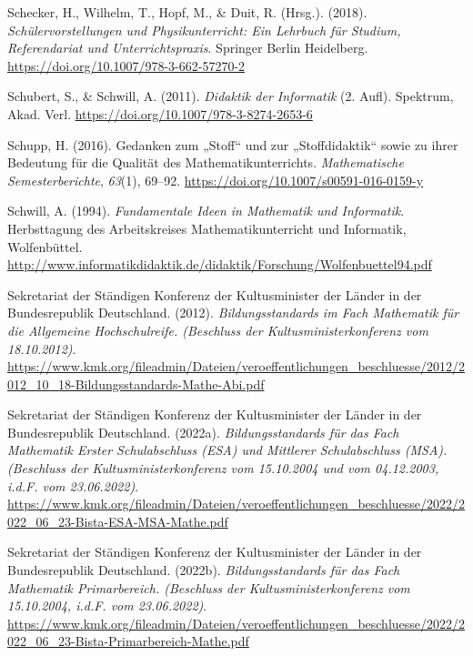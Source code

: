 \documentclass[
]{scrbook}
\newlength{\cslhangindent}
\newenvironment{CSLReferences}[2] %
 {\begin{list}{}{%
  \setlength{\itemindent}{0pt}
  \setlength{\leftmargin}{0pt}
  \setlength{\parsep}{0pt}
  \ifodd #1
   \setlength{\leftmargin}{\cslhangindent}
   \setlength{\itemindent}{-1\cslhangindent}
  \fi
  \setlength{\itemsep}{#2\baselineskip}}}
 {\end{list}}
\theoremstyle{definition}
\theoremstyle{definition}
\theoremstyle{definition}
\theoremstyle{definition}
\theoremstyle{remark}
\begin{document}
\begin{CSLReferences}{1}{0}
Schecker, H., Wilhelm, T., Hopf, M., \& Duit, R. (Hrsg.). (2018). \emph{Schülervorstellungen und {Physikunterricht}: {Ein} {Lehrbuch} für {Studium}, {Referendariat} und {Unterrichtspraxis}}. Springer Berlin Heidelberg. \url{https://doi.org/10.1007/978-3-662-57270-2}

Schubert, S., \& Schwill, A. (2011). \emph{Didaktik der {Informatik}} (2. Aufl). Spektrum, Akad. Verl. \url{https://doi.org/10.1007/978-3-8274-2653-6}

Schupp, H. (2016). Gedanken zum „{Stoff}`` und zur „{Stoffdidaktik}`` sowie zu ihrer {Bedeutung} für die {Qualität} des {Mathematikunterrichts}. \emph{Mathematische Semesterberichte}, \emph{63}(1), 69--92. \url{https://doi.org/10.1007/s00591-016-0159-y}

Schwill, A. (1994). \emph{Fundamentale {Ideen} in {Mathematik} und {Informatik}}. Herbsttagung des Arbeitskreises Mathematikunterricht und Informatik, Wolfenbüttel. \url{http://www.informatikdidaktik.de/didaktik/Forschung/Wolfenbuettel94.pdf}

Sekretariat der Ständigen Konferenz der Kultusminister der Länder in der Bundesrepublik Deutschland. (2012). \emph{Bildungsstandards im {Fach} {Mathematik} für die {Allgemeine} {Hochschulreife}. (Beschluss der Kultusministerkonferenz vom 18.10.2012)}. \url{https://www.kmk.org/fileadmin/Dateien/veroeffentlichungen_beschluesse/2012/2012_10_18-Bildungsstandards-Mathe-Abi.pdf}

Sekretariat der Ständigen Konferenz der Kultusminister der Länder in der Bundesrepublik Deutschland. (2022a). \emph{Bildungsstandards für das {Fach} {Mathematik} {Erster} {Schulabschluss} ({ESA}) und {Mittlerer} {Schulabschluss} ({MSA}). ({Beschluss} der {Kultusministerkonferenz} vom 15.10.2004 und vom 04.12.2003, i.d.{F}. vom 23.06.2022)}. \url{https://www.kmk.org/fileadmin/Dateien/veroeffentlichungen_beschluesse/2022/2022_06_23-Bista-ESA-MSA-Mathe.pdf}

Sekretariat der Ständigen Konferenz der Kultusminister der Länder in der Bundesrepublik Deutschland. (2022b). \emph{Bildungsstandards für das {Fach} {Mathematik} {Primarbereich}. ({Beschluss} der {Kultusministerkonferenz} vom 15.10.2004, i.d.{F}. vom 23.06.2022)}. \url{https://www.kmk.org/fileadmin/Dateien/veroeffentlichungen_beschluesse/2022/2022_06_23-Bista-Primarbereich-Mathe.pdf}


\end{CSLReferences}
\end{document}
